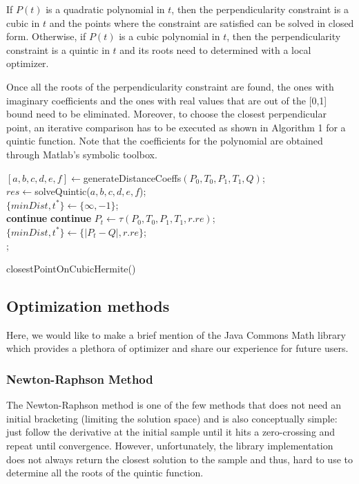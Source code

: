 \documentclass[journal, letterpaper]{IEEEtran}
\begin{document}
If $P(t)$ is a quadratic polynomial in $t$, then the perpendicularity constraint is a cubic in $t$ and
the points where the constraint are satisfied can be solved in closed form. Otherwise, if $P(t)$ is a 
cubic polynomial in $t$, then the perpendicularity constraint is a quintic in $t$ and its roots
need to determined with a local optimizer. 

Once all the roots of the perpendicularity constraint are found, the ones with imaginary coefficients
and the ones with real values that are out of the [0,1] bound need to be eliminated. Moreover, to
choose the closest perpendicular point, an iterative comparison has to be executed as shown in 
Algorithm 1 for a quintic function. Note that the coefficients for the polynomial are obtained
through Matlab's symbolic toolbox. 

\begin{algorithm}[ht!]
  $[a,b,c,d,e,f] \leftarrow $generateDistanceCoeffs$(P_0,T_0,P_1,T_1,Q)$; \\
  $res \leftarrow $solveQuintic($a,b,c,d,e,f$); \\
  $\{minDist, t^*\} \leftarrow \{\infty,-1\}$;\\
   {
     {
			\textbf{continue}
		}
     {
			\textbf{continue}
		}
    $P_t \leftarrow \tau(P_0,T_0,P_1,T_1,r.re)$; \\
     {
      $\{minDist, t^*\} \leftarrow \{|P_t - Q|, r.re\}$;\\
    }
  }
  ;
  \caption{closestPointOnCubicHermite()}
\end{algorithm}

\subsection{Optimization methods}

Here, we would like to make a brief mention of the Java Commons Math library which provides a 
plethora of optimizer and share our experience for future users. 

\subsubsection{Newton-Raphson Method}
The Newton-Raphson method is one of the few methods that does not need an initial bracketing (limiting
the solution space) and is also conceptually simple: just follow the derivative at the initial sample
until it hits a zero-crossing and repeat until convergence. However, unfortunately, the library
implementation does not always return the closest solution to the sample and thus, hard to use to 
determine all the roots of the quintic function.
\end{document}
